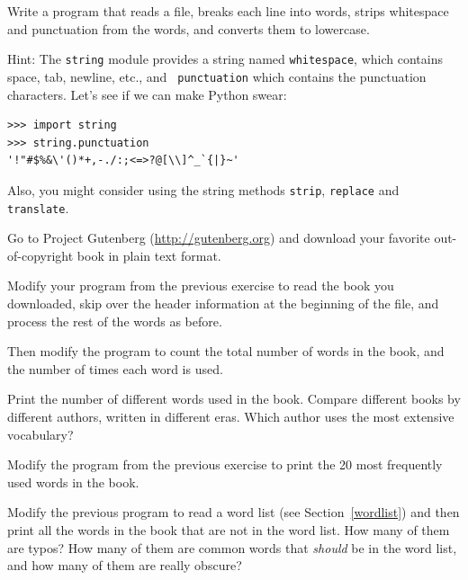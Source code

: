 \documentclass[10pt]{book}
\begin{document}
\begin{exercise}

Write a program that reads a file, breaks each line into
words, strips whitespace and punctuation from the words, and
converts them to lowercase.

Hint: The {\tt string} module provides a string named {\tt whitespace},
which contains space, tab, newline, etc., and {\tt
  punctuation} which contains the punctuation characters.  Let's see
if we can make Python swear:

\begin{verbatim}
>>> import string
>>> string.punctuation
'!"#$%&\'()*+,-./:;<=>?@[\\]^_`{|}~'
\end{verbatim}
%
Also, you might consider using the string methods {\tt strip},
{\tt replace} and {\tt translate}.

\end{exercise}


\begin{exercise}

Go to Project Gutenberg (\url{http://gutenberg.org}) and download 
your favorite out-of-copyright book in plain text format.

Modify your program from the previous exercise to read the book
you downloaded, skip over the header information at the beginning
of the file, and process the rest of the words as before.

Then modify the program to count the total number of words in
the book, and the number of times each word is used.

Print the number of different words used in the book.  Compare
different books by different authors, written in different eras.
Which author uses the most extensive vocabulary?
\end{exercise}


\begin{exercise}

Modify the program from the previous exercise to print the
20 most frequently used words in the book.

\end{exercise}


\begin{exercise}

Modify the previous program to read a word list (see
Section~\ref{wordlist}) and then print all the words in the book that
are not in the word list.  How many of them are typos?  How many of
them are common words that {\em should} be in the word list, and how
many of them are really obscure?

\end{exercise}
\end{document}
